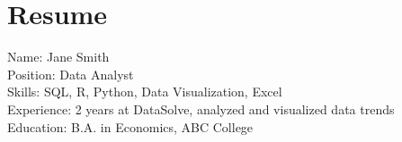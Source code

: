 \documentclass{article}
\begin{document}
\section*{Resume}
Name: Jane Smith \\
Position: Data Analyst \\
Skills: SQL, R, Python, Data Visualization, Excel \\
Experience: 2 years at DataSolve, analyzed and visualized data trends \\
Education: B.A. in Economics, ABC College
\end{document}
